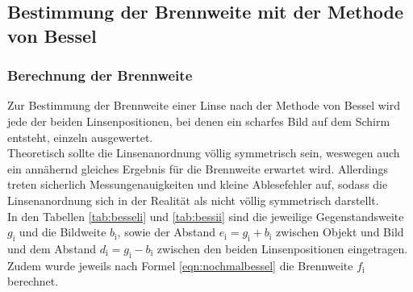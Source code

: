 \FloatBarrier
\subsection{Bestimmung der Brennweite mit der Methode von Bessel}
\subsubsection{Berechnung der Brennweite}
Zur Bestimmung der Brennweite einer Linse nach der Methode von Bessel wird jede der beiden Linsenpositionen, bei denen ein scharfes Bild auf dem Schirm entsteht, einzeln ausgewertet. \\
Theoretisch sollte die Linsenanordnung völlig symmetrisch sein, weswegen auch ein annähernd gleiches Ergebnis für die Brennweite erwartet wird. Allerdings treten sicherlich Messungenauigkeiten und kleine Ablesefehler auf, sodass die Linsenanordnung sich in der Realität als nicht völlig symmetrisch darstellt.
\\In den Tabellen \ref{tab:besseli} und \ref{tab:bessii} sind die jeweilige Gegenstandsweite $g_\mathrm{i}$ und die Bildweite $b_\mathrm{i}$, sowie der Abstand $e_\mathrm{i}=g_\mathrm{i} + b_\mathrm{i}$ zwischen Objekt und Bild und dem Abstand $d_\mathrm{i}=g_\mathrm{i} - b_\mathrm{i}$ zwischen den beiden Linsenpositionen eingetragen.
\\Zudem wurde jeweils nach Formel \ref{eqn:nochmalbessel} die Brennweite $f_\mathrm{i}$ berechnet.
